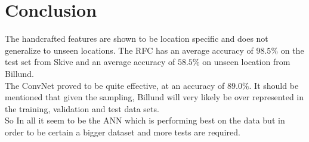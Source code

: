 \documentclass[
    ,title     = {{Methods for image classification}}
    ,longtitle
    ,highlight = dtured
    ,toplogo   = {{template/tex_dtu_compute_b_uk}}
    ,botlogo   = {{template/tex_dtu_frise}}
    ,papersize = {{a0paper}}
    ,colcount  = {{3columns}}
]{dtuposter}
\begin{document}
\begin{minipage}[t]{0.30\textwidth}

\section*{Conclusion}
The handcrafted features are shown to be location specific and does not generalize to unseen locations. The RFC has an average accuracy of $98.5\%$ on the test set from Skive and an average accuracy of $58.5\%$ on unseen location from Billund.\\

The ConvNet proved to be quite effective, at an accuracy of $89.0\%$. It should be mentioned that given the sampling, Billund will very likely be over represented in the training, validation and test data sets.\\

So In all it seem to be the ANN which is performing best on the data but in order to be certain a bigger dataset and more tests are required.

\end{minipage}

\end{document}

